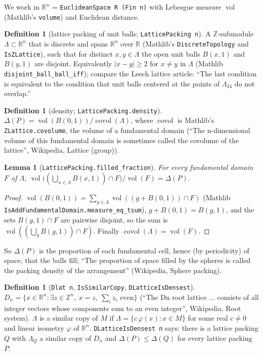 \documentclass[11pt]{article}
\newtheorem{lemma}[theorem]{Lemma}
\theoremstyle{definition}
\newtheorem{definition}[theorem]{Definition}
\theoremstyle{remark}
\newcommand{\R}{\mathbb{R}}
\newcommand{\Z}{\mathbb{Z}}
\newcommand{\covol}{\operatorname{covol}}
\newcommand{\vol}{\operatorname{vol}}
\begin{document}
We work in $\R^n$ = \texttt{EuclideanSpace R (Fin n)} with Lebesgue measure $\vol$ (Mathlib's
\texttt{volume}) and Euclidean distance.

\begin{definition}[lattice packing of unit balls; \texttt{LatticePacking n}]
A $\Z$-submodule $\Lambda\subset\R^n$ that is discrete and spans $\R^n$ over $\R$ (Mathlib's
\texttt{DiscreteTopology} and \texttt{IsZLattice}), such that for distinct $x,y\in\Lambda$ the open
unit balls $B(x,1)$ and $B(y,1)$ are disjoint. Equivalently $|x-y|\ge 2$ for $x\neq y$ in $\Lambda$
(Mathlib \texttt{disjoint\_ball\_ball\_iff}); compare the Leech lattice article: ``The last condition
is equivalent to the condition that unit balls centered at the points of $\Lambda_{24}$ do not
overlap.''
\end{definition}

\begin{definition}[density; \texttt{LatticePacking.density}]
$\Delta(P)=\vol(B(0,1))/\covol(\Lambda)$, where $\covol$ is Mathlib's \texttt{ZLattice.covolume},
the volume of a fundamental domain (``The n-dimensional volume of this fundamental domain is
sometimes called the covolume of the lattice'', Wikipedia, Lattice (group)).
\end{definition}

\begin{lemma}[\texttt{LatticePacking.filled\_fraction}]
For every fundamental domain $F$ of $\Lambda$,
$\vol\big((\bigcup_{x\in\Lambda}B(x,1))\cap F\big)/\vol(F)=\Delta(P)$.
\end{lemma}
\begin{proof}
$\vol(B(0,1))=\sum_{g\in\Lambda}\vol((g+B(0,1))\cap F)$ (Mathlib
\texttt{IsAddFundamentalDomain.measure\_eq\_tsum}), $g+B(0,1)=B(g,1)$, and the sets
$B(g,1)\cap F$ are pairwise disjoint, so the sum is $\vol((\bigcup_g B(g,1))\cap F)$. Finally
$\covol(\Lambda)=\vol(F)$.
\end{proof}
So $\Delta(P)$ is the proportion of each fundamental cell, hence (by periodicity) of space, that the
balls fill; ``The proportion of space filled by the spheres is called the packing density of the
arrangement'' (Wikipedia, Sphere packing).

\begin{definition}[\texttt{Dlat n}, \texttt{IsSimilarCopy}, \texttt{DLatticeIsDensest}]
$D_n=\{x\in\R^n:\exists z\in\Z^n,\ x=z,\ \sum_i z_i \text{ even}\}$ (``The Dn root lattice ...
consists of all integer vectors whose components sum to an even integer'', Wikipedia, Root system).
$\Lambda$ is a similar copy of $M$ if $\Lambda=\{c\,\varphi(x):x\in M\}$ for some real $c\neq0$ and
linear isometry $\varphi$ of $\R^n$. \texttt{DLatticeIsDensest n} says: there is a lattice packing
$Q$ with $\Lambda_Q$ a similar copy of $D_n$ and $\Delta(P)\le\Delta(Q)$ for every lattice
packing $P$.
\end{definition}
\end{document}
